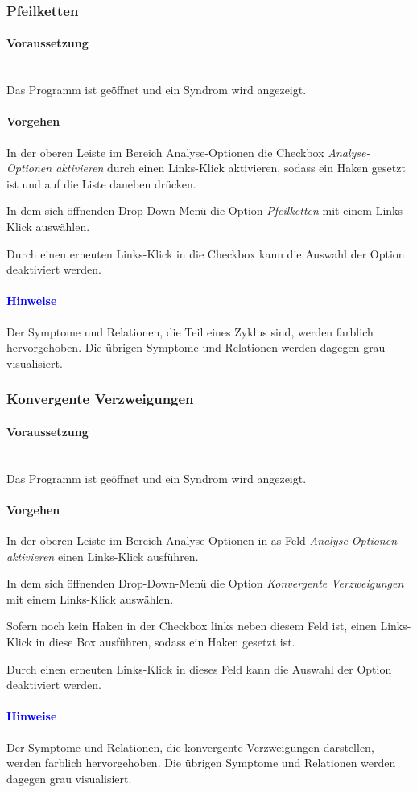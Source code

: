 \documentclass[enabledeprecatedfontcommands,fontsize=11pt,paper=a4,twoside]{scrartcl}
\newcounter{one}
\newcounter{two}[one]
\newcommand*{\hint}{\paragraph{\textcolor{blue}{Hinweise}}}
\newcommand*{\condition}{\paragraph{Voraussetzung}$\;$ \vspace{0.2cm}\\}
\newcommand*{\action}{\paragraph{Vorgehen}}
\let\tempone\itemize
\let\temptwo\enditemize
\renewenvironment{itemize}{\tempone\addtolength{\itemsep}{-10.0pt}}{\temptwo}
\let\origenumerate\enumerate
\let\origendenumerate\endenumerate
\renewenvironment{enumerate}{\origenumerate \addtolength{\itemsep}{-10.0pt}}{\origendenumerate}
\begin{document}
\subsubsection{Pfeilketten}
	\condition 
		Das Programm ist geöffnet und ein Syndrom wird angezeigt.
	\action
	\begin{enumerate}
		\item In der oberen Leiste im Bereich Analyse-Optionen die Checkbox \textit{Analyse-Optionen aktivieren} durch einen Links-Klick aktivieren, sodass ein Haken gesetzt ist und auf die Liste daneben drücken.
		\item In dem sich öffnenden Drop-Down-Menü die Option \textit{Pfeilketten} mit einem Links-Klick auswählen. 
		\item Durch einen erneuten Links-Klick in die Checkbox kann die Auswahl der Option deaktiviert werden.
	\end{enumerate} 
	\hint
	\begin{itemize}
		\item Der Symptome und Relationen, die Teil eines Zyklus sind, werden farblich hervorgehoben. Die übrigen Symptome und Relationen werden dagegen grau visualisiert.\\
	\end{itemize}

\subsubsection{Konvergente Verzweigungen}
	\condition 
	Das Programm ist geöffnet und ein Syndrom wird angezeigt.
	\action
	\begin{enumerate}
		\item In der oberen Leiste im Bereich Analyse-Optionen in as Feld \textit{Analyse-Optionen aktivieren} einen Links-Klick ausführen.
		\item In dem sich öffnenden Drop-Down-Menü die Option \textit{Konvergente Verzweigungen} mit einem Links-Klick auswählen. 
		\item Sofern noch kein Haken in der Checkbox links neben diesem Feld ist, einen Links-Klick in diese Box ausführen, sodass ein Haken gesetzt ist.
		\item Durch einen erneuten Links-Klick in dieses Feld kann die Auswahl der Option deaktiviert werden.
	\end{enumerate} 
	\hint
	\begin{itemize}
		\item Der Symptome und Relationen, die konvergente Verzweigungen darstellen, werden farblich hervorgehoben. Die übrigen Symptome und Relationen werden dagegen grau visualisiert. \\
	\end{itemize}
\end{document}
